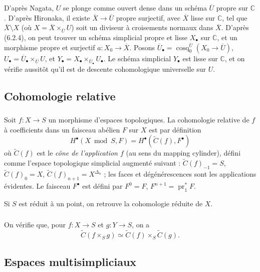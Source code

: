 \documentclass[11pt]{amsart}
\theoremstyle{plain}
\theoremstyle{definition}
\DeclareMathOperator{\cosq}{cosq}
\DeclareMathOperator{\pr}{pr}
\newcommand{\CC}{\mathbb{C}}
\begin{document}
D'apr\`es Nagata, $U$ se plonge comme ouvert dense dans un sch\'ema $\overline{U}$ propre sur $\CC$. D'apr\`es Hironaka, il existe $\overline{X} \to \overline{U}$ propre surjectif, avec $\overline{X}$ lisse sur $\CC$, tel que $\overline{X} \setminus X$ (o\`u $X = \overline{X} \times_{\overline{U}} U$) soit un diviseur \`a croisements normaux dans $\overline{X}$. D'apr\`es (6.2.4), on peut trouver un sch\'ema simplicial propre et lisse $X_\bullet$ sur $\CC$, et un morphisme propre et surjectif $a : X_0 \to \overline{X}$. Posons $\overline{U}_\bullet = \cosq_0^{\overline{U}}(X_0 \to \overline{U})$, $U_\bullet = \overline{U}_\bullet \times_{\overline{U}} U$, et $Y_\bullet = X_\bullet \times_{\overline{U}_\bullet} U_\bullet$. Le sch\'ema simplicial $Y_\bullet$ est lisse sur $\CC$, et on v\'erifie aussit\^ot qu'il est de descente cohomologique universelle sur $U$.

\subsection{Cohomologie relative}

\subsubsection{}
Soit $f : X \to S$ un morphisme d'espaces topologiques. La cohomologie relative de $f$ \`a coefficients dans un faisceau ab\'elien $F$ sur $X$ est par d\'efinition
\[
H^\bullet(X \bmod S, F) = H^\bullet(\widetilde{C}(f), F^\bullet)
\]
o\`u $\widetilde{C}(f)$ est le \emph{c\^one de l'application $f$} (au sens du mapping cylinder), d\'efini comme l'espace topologique simplicial augment\'e suivant : $\widetilde{C}(f)_{-1} = S$, $\widetilde{C}(f)_0 = X$, $\widetilde{C}(f)_{n+1} = X^{\Delta_n}$ ; les faces et d\'eg\'en\'erescences sont les applications \'evidentes. Le faisceau $F^\bullet$ est d\'efini par $F^0 = F$, $F^{n+1} = \pr_1^* F$.

Si $S$ est r\'eduit \`a un point, on retrouve la cohomologie r\'eduite de $X$.

\subsubsection{}
On v\'erifie que, pour $f : X \to S$ et $g : Y \to S$, on a
\[
\widetilde{C}(f \times_S g) \simeq \widetilde{C}(f) \times_S \widetilde{C}(g).
\]

\subsection{Espaces multisimpliciaux}
\end{document}
